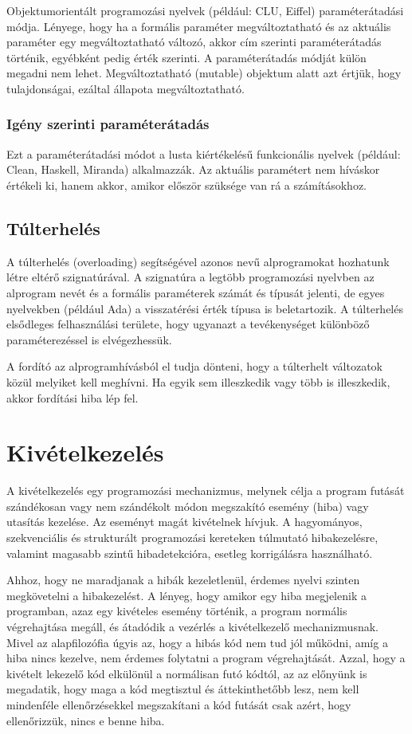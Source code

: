 \documentclass[margin=0px]{article}
\begin{document}
Objektumorientált programozási nyelvek (például: CLU, Eiffel) paraméterátadási módja. Lényege, hogy ha a formális paraméter megváltoztatható és az aktuális paraméter egy megváltoztatható változó, akkor cím szerinti paraméterátadás történik, egyébként pedig érték szerinti. A paraméterátadás módját külön megadni nem lehet.
Megváltoztatható (mutable) objektum alatt azt értjük, hogy tulajdonságai, ezáltal állapota megváltoztatható.

\subsubsection{Igény szerinti paraméterátadás}

Ezt a paraméterátadási módot a lusta kiértékelésű funkcionális nyelvek (például: Clean, Haskell, Miranda) alkalmazzák. Az aktuális paramétert nem híváskor értékeli ki, hanem akkor, amikor először szüksége van rá a számításokhoz.

\subsection{Túlterhelés}

A túlterhelés (overloading) segítségével azonos nevű alprogramokat hozhatunk létre eltérő szignatúrával. A szignatúra a legtöbb programozási nyelvben az alprogram nevét és a formális paraméterek számát és típusát jelenti, de egyes nyelvekben (például Ada) a visszatérési érték típusa is beletartozik. A túlterhelés elsődleges felhasználási területe, hogy ugyanazt a tevékenységet különböző paraméterezéssel is elvégezhessük.

A fordító az alprogramhívásból el tudja dönteni, hogy a túlterhelt változatok közül melyiket kell meghívni. Ha egyik sem illeszkedik vagy több is illeszkedik, akkor fordítási hiba lép fel.

\section{Kivételkezelés}
A kivételkezelés egy programozási mechanizmus, melynek célja a program futását szándékosan vagy nem szándékolt módon megszakító esemény (hiba) vagy utasítás kezelése. Az eseményt magát kivételnek hívjuk. A hagyományos, szekvenciális és strukturált programozási kereteken túlmutató hibakezelésre, valamint magasabb szintű hibadetekcióra, esetleg korrigálásra használható.

Ahhoz, hogy ne maradjanak a hibák kezeletlenül, érdemes nyelvi szinten megkövetelni a hibakezelést. A lényeg, hogy amikor egy hiba megjelenik a programban, azaz egy kivételes esemény történik, a program normális végrehajtása megáll, és átadódik a vezérlés a kivételkezelő mechanizmusnak. Mivel az alapfilozófia úgyis az, hogy a hibás kód nem tud jól működni, amíg a hiba nincs kezelve, nem érdemes folytatni a program végrehajtását. Azzal, hogy a kivételt lekezelő kód elkülönül a normálisan futó kódtól, az az előnyünk is megadatik, hogy maga a kód megtisztul és áttekinthetőbb lesz, nem kell mindenféle ellenőrzésekkel megszakítani a kód futását csak azért, hogy ellenőrizzük, nincs e benne hiba.
\end{document}

